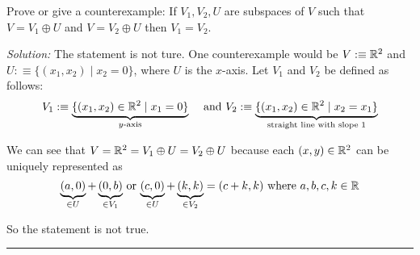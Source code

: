 \setcounter{xrcs}{22}
\begin{xrcs}
  Prove or give a counterexample: If $V_1, V_2, U$ are subspaces of $V$ such that $V=V_1 \oplus U$ and $V=V_2 \oplus U$ then $V_1 = V_2$.

  \emph{Solution:} The statement is not ture. One counterexample would be $V :\equiv \mathbb{R}^2$ and $U :\equiv \{ (x_1, x_2) \mid x_2=0 \}$, where $U$ is the $x$-axis. Let $V_1$ and $V_2$ be defined as follows:
  \[
    V_1 :\equiv \underbrace{\{(x_1, x_2) \in \real^2 \mid x_1 = 0 \}}_{\text{$y$-axis}} \quad $ and $
    V_2 :\equiv \underbrace{\{ (x_1, x_2) \in \real^2 \mid x_2 = x_1 \}}_{\text{straight line with slope $1$}}
  \]

  We can see that $V=\mathbb{R}^2=V_1 \oplus U = V_2 \oplus U$  because each $(x,y)\in \mathbb{R}^2$ can be uniquely represented as \begin{equation}
    \underbrace{(a,0)}_{\in U}+\underbrace{(0,b)}_{\in V_1}$ or $\underbrace{(c,0)}_{\in U}+\underbrace{(k,k)}_{\in V_2}=(c+k,k)$ where $a,b,c,k \in \real
  \end{equation}

  So the statement is not true.
\end{xrcs}

\phantom{.}

\hrule